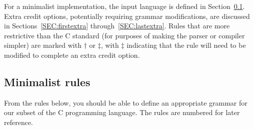 \documentclass{article}
\begin{document}
For a minimalist implementation,
the input language is defined in Section~\ref{SEC:minimal}.
Extra credit options,
  potentially requiring grammar modifications,
are discussed in Sections~\ref{SEC:firstextra}
through~\ref{SEC:lastextra}.
Rules that are more restrictive than the C standard
(for purposes of making the parser or compiler simpler)
are marked with $\dagger$ or $\ddagger$,
with $\ddagger$ indicating that the rule will need to be modified
to complete an extra credit option.

\subsection{Minimalist rules}
\label{SEC:minimal}

From the rules below,
you should be able to define an appropriate grammar
for our subset of the C programming language.
The rules are numbered for later reference.
%
%
\end{document}
